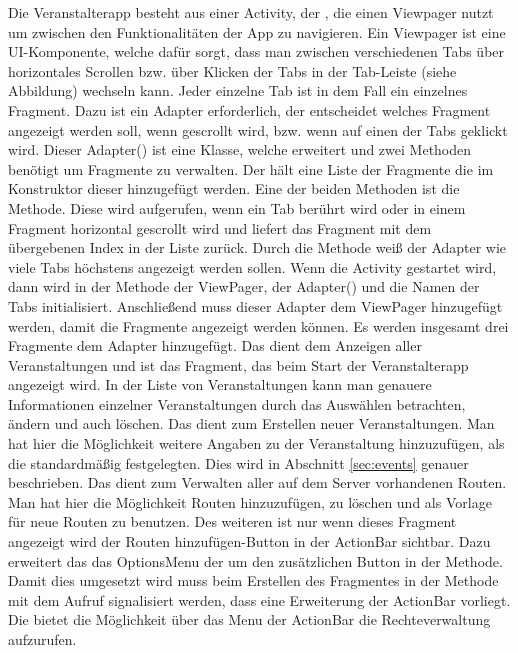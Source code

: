 Die Veranstalterapp besteht aus einer Activity, der , die einen Viewpager nutzt um zwischen den Funktionalitäten der App zu navigieren. Ein Viewpager ist eine UI-Komponente, welche dafür sorgt, dass man zwischen verschiedenen Tabs über horizontales Scrollen bzw. über Klicken der Tabs in der Tab-Leiste (siehe Abbildung) wechseln kann. Jeder einzelne Tab ist in dem Fall ein einzelnes Fragment. Dazu ist ein Adapter erforderlich, der entscheidet welches Fragment angezeigt werden soll, wenn gescrollt wird, bzw. wenn auf einen der Tabs geklickt wird. Dieser Adapter() ist eine Klasse, welche  erweitert und zwei Methoden benötigt um Fragmente zu verwalten. Der  hält eine Liste der Fragmente die im Konstruktor dieser hinzugefügt werden. Eine der beiden Methoden ist die  Methode. Diese wird aufgerufen, wenn ein Tab berührt wird oder in einem Fragment horizontal gescrollt wird und liefert das Fragment mit dem übergebenen Index in der Liste zurück. Durch die  Methode weiß der Adapter wie viele Tabs höchstens angezeigt werden sollen. Wenn die Activity gestartet wird, dann wird in der  Methode der ViewPager, der Adapter() und die Namen der Tabs initialisiert. Anschließend muss dieser Adapter dem ViewPager hinzugefügt werden, damit die Fragmente angezeigt werden können. Es werden insgesamt drei Fragmente dem Adapter hinzugefügt. Das  dient dem Anzeigen aller Veranstaltungen und ist das Fragment, das beim Start der Veranstalterapp angezeigt wird. In der Liste von Veranstaltungen kann man genauere Informationen einzelner Veranstaltungen durch das Auswählen betrachten, ändern und auch löschen. Das  dient zum Erstellen neuer Veranstaltungen. Man hat hier die Möglichkeit weitere Angaben zu der Veranstaltung hinzuzufügen, als die standardmäßig festgelegten. Dies wird in Abschnitt \ref{sec:events} genauer beschrieben. Das  dient zum Verwalten aller auf dem Server vorhandenen Routen. Man hat hier die Möglichkeit Routen hinzuzufügen, zu löschen und als Vorlage für neue Routen zu benutzen. Des weiteren ist nur wenn dieses Fragment angezeigt wird der \glqq Routen hinzufügen\grqq-Button in der ActionBar sichtbar. Dazu erweitert das  das OptionsMenu der  um den zusätzlichen Button in der  Methode. Damit dies umgesetzt wird muss beim Erstellen des Fragmentes in der  Methode mit dem Aufruf  signalisiert werden, dass eine Erweiterung der ActionBar vorliegt. Die  bietet die Möglichkeit über das Menu der ActionBar die Rechteverwaltung aufzurufen. 

